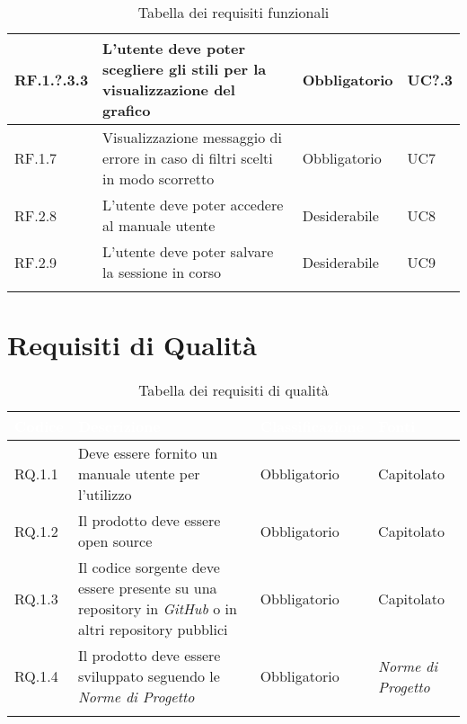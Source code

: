 \begin{center}
\begin{longtable}{|L{2cm}|C{5,5cm}|C{3cm}|C{2cm}|}
    RF.1.?.3.3 & L'utente deve poter scegliere gli stili per la visualizzazione del grafico & Obbligatorio & UC?.3 \\ \hline
    RF.1.7 & Visualizzazione messaggio di errore in caso di filtri scelti in modo scorretto & Obbligatorio & UC7 \\ \hline
    RF.2.8 & L'utente deve poter accedere al manuale utente & Desiderabile & UC8 \\ \hline
    RF.2.9 & L'utente deve poter salvare la sessione in corso & Desiderabile & UC9 \\ \hline

    \caption{Tabella dei requisiti funzionali}
  \end{longtable}
\end{center}

\section{Requisiti di Qualità}
\begin{center}
  \centering
  \begin{longtable}{|L{1,5cm}|C{5,5cm}|C{3cm}|C{2cm}|}
    \hline
    \textcolor[HTML]{FFFFFF}{\textbf{Codice}} & \textcolor[HTML]{FFFFFF}{\textbf{Descrizione}} & \textcolor[HTML]{FFFFFF}{\textbf{Classificazione}} & \textcolor[HTML]{FFFFFF}{\textbf{Fonti}}
    \\ \hline
    RQ.1.1 & Deve essere fornito un manuale utente per l'utilizzo & Obbligatorio & Capitolato \\ \hline
    RQ.1.2 & Il prodotto deve essere open source & Obbligatorio & Capitolato \\ \hline
    RQ.1.3 & Il codice sorgente deve essere presente su una repository in \textit{GitHub} o in altri repository pubblici & Obbligatorio & Capitolato \\ \hline
    RQ.1.4 & Il prodotto deve essere sviluppato seguendo le \textit{Norme di Progetto} & Obbligatorio & \textit{Norme di Progetto} \\ \hline

    \caption{Tabella dei requisiti di qualità}
  \end{longtable}
\end{center}

